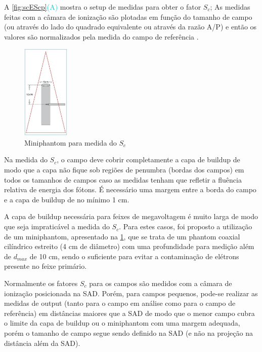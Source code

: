 \documentclass[11pt,a4paper]{article}
\begin{document}
    A \ref{fig:scEScp}\textcolor{DarkTurquoise}{(A)} mostra o setup de medidas para obter o fator $S_c$; As medidas feitas com a câmara de ionização são plotadas em função do tamanho de campo (ou através do lado do quadrado equivalente ou através da razão A/P) e então os valores são normalizados pela medida do campo de referência . 

    \begin{figure}
        \centering
        \includegraphics[width=0.2\textwidth]{Imagens/miniphantom.JPG}
        \caption{Miniphantom para medida do $S_c$} 
        \label{fig:miniphantom}
    \end{figure}

    Na medida do $S_c$, o campo deve cobrir completamente a capa de buildup de modo que a capa não fique sob regiões de penumbra (bordas dos campos) em todos os tamanhos de campos caso as medidas tenham que refletir a fluência relativa de energia dos fótons. É necessário uma margem entre a borda do campo e a capa de buildup de no mínimo 1 cm.
    
    A capa de buildup necessária para feixes de megavoltagem é muito larga de modo que seja impraticável a medida do $S_c$. Para estes casos, foi proposto a utilização de um miniphantom, apresentado na \ref{fig:miniphantom}, que se trata de um phantom coaxial cilíndrico estreito (4 cm de diâmetro) com uma profundidade para medição além de $d_{max}$  de 10 cm, sendo o suficiente  para evitar a contaminação de elétrons presente no feixe primário.

    Normalmente os fatores $S_c$ para os campos são medidos com a câmara de ionização posicionada na SAD. Porém, para campos pequenos, pode-se realizar as medidas de output (tanto para o campo em análise como para o campo de referência) em distâncias maiores que a SAD de modo que o menor campo cubra o limite da capa de buildup ou o miniphantom com uma margem adequada, porém o tamanho de campo segue sendo definido na SAD (e não na projeção na distância além da SAD).
\end{document}
